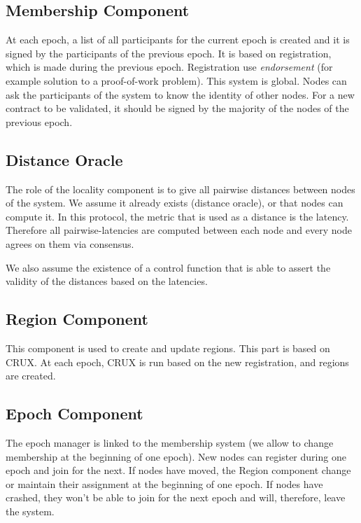 \documentclass[a4paper,11pt,twoside,openright]{report}
\begin{document}
\subsection{Membership Component}

At each epoch, a list of all participants for the
current epoch is created and it is signed by the participants of the previous epoch. It is based on registration, which is made during
the previous epoch. Registration use \textit{endorsement} (for example solution
to a proof-of-work problem). This system is global. Nodes can ask the
participants of the system to know the identity of other nodes. For a new contract to be validated, it should be signed by the majority of the nodes of the previous
epoch.

\subsection{Distance Oracle}

The role of the locality component is to give all pairwise distances between
nodes of the system. We assume it already exists (distance oracle), or that nodes can compute it. In this protocol, the metric that is used as a distance
is the latency. Therefore all pairwise-latencies are computed between each node and every
node agrees on them via consensus.

We also assume the existence of a control function that is able to assert the validity of the distances based on the latencies. 
 
\subsection{Region Component} This component is used to create and update
regions. This part is based on CRUX. At each epoch, CRUX is run based on
the new registration, and regions are created.
 
\subsection{Epoch Component} The epoch manager is linked to the membership
system (we allow to change membership at the beginning of one epoch). New nodes
can register during one epoch and join for the next. If nodes have moved, the Region
component change or maintain their assignment at the beginning of one
epoch. If nodes have crashed, they won't be able to join for the next epoch and
will, therefore, leave the system.
\end{document}
